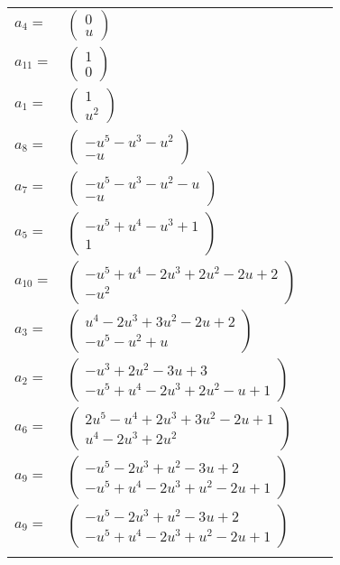 \documentclass[1p]{elsarticle_modified}
\theoremstyle{definition}
\begin{document}
\begin{tabular}{m{7pt} m{180pt} m{7pt} m{180pt} }
\flushright $a_{4}=$&$\begin{pmatrix}0\\u\end{pmatrix}$ \\
\flushright $a_{11}=$&$\begin{pmatrix}1\\0\end{pmatrix}$ \\
\flushright $a_{1}=$&$\begin{pmatrix}1\\u^2\end{pmatrix}$ \\
\flushright $a_{8}=$&$\begin{pmatrix}- u^5- u^3- u^2\\- u\end{pmatrix}$ \\
\flushright $a_{7}=$&$\begin{pmatrix}- u^5- u^3- u^2- u\\- u\end{pmatrix}$ \\
\flushright $a_{5}=$&$\begin{pmatrix}- u^5+u^4- u^3+1\\1\end{pmatrix}$ \\
\flushright $a_{10}=$&$\begin{pmatrix}- u^5+u^4-2 u^3+2 u^2-2 u+2\\- u^2\end{pmatrix}$ \\
\flushright $a_{3}=$&$\begin{pmatrix}u^4-2 u^3+3 u^2-2 u+2\\- u^5- u^2+u\end{pmatrix}$ \\
\flushright $a_{2}=$&$\begin{pmatrix}- u^3+2 u^2-3 u+3\\- u^5+u^4-2 u^3+2 u^2- u+1\end{pmatrix}$ \\
\flushright $a_{6}=$&$\begin{pmatrix}2 u^5- u^4+2 u^3+3 u^2-2 u+1\\u^4-2 u^3+2 u^2\end{pmatrix}$ \\
\flushright $a_{9}=$&$\begin{pmatrix}- u^5-2 u^3+u^2-3 u+2\\- u^5+u^4-2 u^3+u^2-2 u+1\end{pmatrix}$\\ \flushright $a_{9}=$&$\begin{pmatrix}- u^5-2 u^3+u^2-3 u+2\\- u^5+u^4-2 u^3+u^2-2 u+1\end{pmatrix}$\\&\end{tabular}
\end{document}

